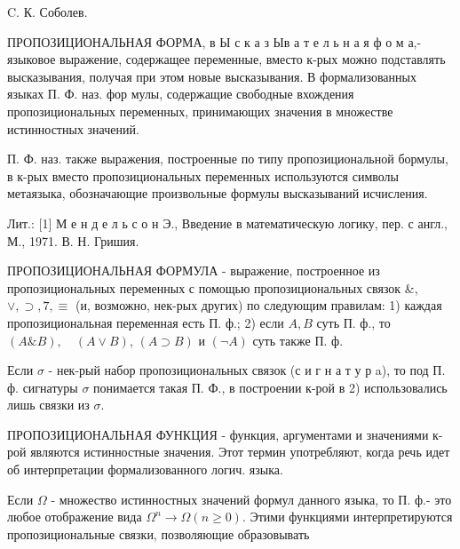 \documentclass[10pt]{article}
\begin{document}
C. К. Соболев.



ПРОПОЗИЦИОНАЛЬНАЯ ФОРМА, в Ы с к а з Ыв а т е л ь н а я ф о м а,- языковое выражение, содержащее переменные, вместо к-рых можно подставлять высказывания, получая при этом новые высказывания. В формализованных языках П. Ф. наз. фор мулы, содержащие свободные вхождения пропозициональных переменных, принимающих значения в множестве истинностных значений.



П. Ф. наз. также выражения, построенные по типу пропозициональной бормулы, в к-рых вместо пропозициональных переменных используются символы метаязыка, обозначающие произвольные формулы высказываний исчисления.



Лит.: [1] М е н д е л ь с о н Э., Введение в математическую логику, пер. с англ., М., 1971. В. Н. Гришия.



ПРОПОЗИЦИОНАЛЬНАЯ ФОРМУЛА - выражение, построенное из пропозициональных переменных с помощью пропозициональных связок \&, $\vee, \supset, 7, \equiv$ (и, возможно, нек-рых других) по следующим правилам: 1) каждая пропозициональная переменная есть П. ф.; 2) если $A, B$ суть П. ф., то $(A \& B), \quad(A \vee B)$, $(A \supset B)$ и $(\neg A)$ суть также П. ф.



Если $\sigma$ - нек-рый набор пропозициональных связок (с и г н а т у р a), то под П. ф. сигнатуры $\sigma$ понимается такая П. Ф., в построении к-рой в 2) использовались лишь связки из $\sigma$.



ПРОПОЗИЦИОНАЛЬНАЯ ФУНКЦИЯ - функция, аргументами и значениями к-рой являются истинностные значения. Этот термин употребляют, когда речь идет об интерпретации формализованного логич. языка.



Если $\Omega$ - множество истинностных значений формул данного языка, то П. ф.- это любое отображение вида $\Omega^{n} \rightarrow \Omega(n \geqslant 0)$. Этими функциями интерпретируются пропозициональные связки, позволяющие образовывать
\end{document}
